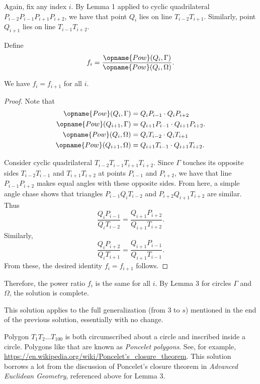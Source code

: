 Again, fix any index $i$.
By Lemma 1 applied to cyclic quadrilateral $P_{i - 2}P_{i - 1}P_{i + 1}P_{i + 2}$,
we have that point $Q_i$ lies on line $T_{i - 2}T_{i + 1}$.
Similarly, point $Q_{i + 1}$ lies on line $T_{i - 1}T_{i + 2}$.


Define \[f_i = \frac{\opname{Pow}(Q_i, \Gamma)}{\opname{Pow}(Q_i, \Omega)}.\]
\begin{claim*}
  We have $f_i = f_{i + 1}$ for all $i$.
\end{claim*}
\begin{proof}
Note that
\begin{align*}
\opname{Pow}(Q_i, \Gamma)
  &= Q_iP_{i - 1} \cdot Q_iP_{i + 2} \\
\opname{Pow}(Q_{i + 1}, \Gamma)
  &= Q_{i + 1}P_{i - 1} \cdot Q_{i + 1}P_{i + 2}. \\
\opname{Pow}(Q_i, \Omega)
  &= Q_iT_{i - 2} \cdot Q_iT_{i + 1} \\
\opname{Pow}(Q_{i + 1}, \Omega)
  &= Q_{i + 1}T_{i - 1} \cdot Q_{i + 1}T_{i + 2}.
\end{align*}

Consider cyclic quadrilateral $T_{i - 2}T_{i - 1}T_{i + 1}T_{i + 2}$.
Since $\Gamma$ touches its opposite sides $T_{i - 2}T_{i - 1}$
and $T_{i + 1}T_{i + 2}$ at points $P_{i - 1}$ and $P_{i + 2}$,
we have that line $P_{i - 1}P_{i + 2}$
makes equal angles with these opposite sides.
From here, a simple angle chase shows
that triangles $P_{i - 1}Q_iT_{i - 2}$ and $P_{i + 2}Q_{i + 1}T_{i + 2}$
are similar.
Thus
\[\frac{Q_iP_{i - 1}}{Q_iT_{i - 2}} = \frac{Q_{i + 1}P_{i + 2}}{Q_{i + 1}T_{i + 2}}.\]
Similarly,
\[\frac{Q_iP_{i + 2}}{Q_iT_{i + 1}} = \frac{Q_{i + 1}P_{i - 1}}{Q_{i + 1}T_{i - 1}}.\]
From these, the desired identity $f_i = f_{i + 1}$ follows.
\end{proof}

Therefore, the power ratio $f_i$ is the same for all $i$.
By Lemma 3 for circles $\Gamma$ and $\Omega$, the solution is complete.

\begin{remark*}
  This solution applies to the full generalization (from $3$ to $s$)
  mentioned in the end of the previous solution,
  essentially with no change.
\end{remark*}

\begin{remark*}
  Polygon $T_1T_2 \dots T_{100}$ is both
  circumscribed about a circle and inscribed inside a circle.
  Polygons like that are known as \emph{Poncelet polygons}.
  See, for example, \url{https://en.wikipedia.org/wiki/Poncelet's_closure_theorem}.
  This solution borrows a lot from the discussion of
  Poncelet's closure theorem in \emph{Advanced Euclidean Geometry},
  referenced above for Lemma 3.
\end{remark*}
